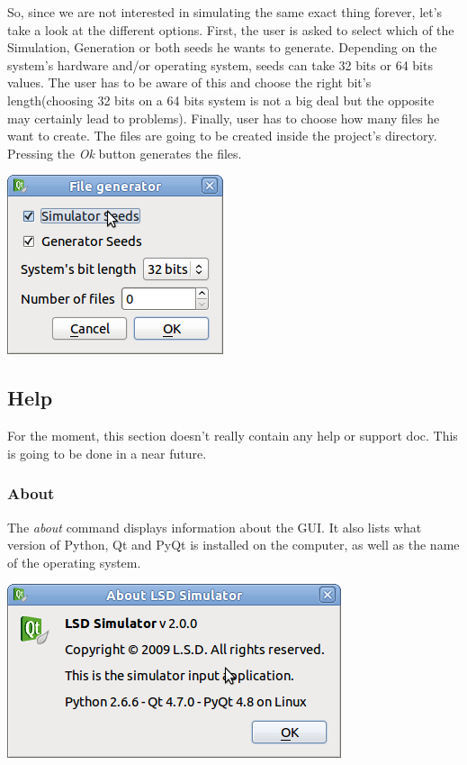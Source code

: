 \documentclass[a4paper,11pt]{report}
\begin{document}
So, since we are not interested in simulating the same exact thing forever, let's take a look at the different options. First, the user is asked to select which of the Simulation, Generation or both seeds he wants to generate. Depending on the system's hardware and/or operating system, seeds can take 32 bits or 64 bits values. The user has to be aware of this and choose the right bit's length(choosing 32 bits on a 64 bits system is not a big deal but the opposite may certainly lead to problems). Finally, user has to choose how many files he want to create. The files are going to be created inside the project's directory. Pressing the \emph{Ok} button generates the files.

\begin{center}
\includegraphics[scale=0.3]{Pictures/Menu/FileGen.png}
\label{fig:confGen}
\end{center}

\subsection{Help}
For the moment, this section doesn't really contain any help or support doc. This is going to be done in a near future.

\subsubsection{About}
The \emph{about} command displays information about the GUI. It also lists what version of Python, Qt and PyQt is installed on the computer, as well as the name of the operating system.

\begin{center}
\includegraphics[scale=0.3]{Pictures/Menu/About.png}
\label{fig:About}
\end{center}
\end{document}
